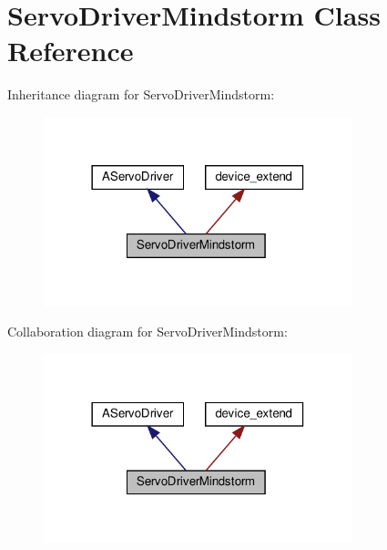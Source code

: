 \hypertarget{classServoDriverMindstorm}{}\section{Servo\+Driver\+Mindstorm Class Reference}
\label{classServoDriverMindstorm}


Inheritance diagram for Servo\+Driver\+Mindstorm\+:
\nopagebreak
\begin{figure}[H]
\begin{center}
\leavevmode
\includegraphics[width=254pt]{classServoDriverMindstorm__inherit__graph}
\end{center}
\end{figure}


Collaboration diagram for Servo\+Driver\+Mindstorm\+:
\nopagebreak
\begin{figure}[H]
\begin{center}
\leavevmode
\includegraphics[width=254pt]{classServoDriverMindstorm__coll__graph}
\end{center}
\end{figure}
